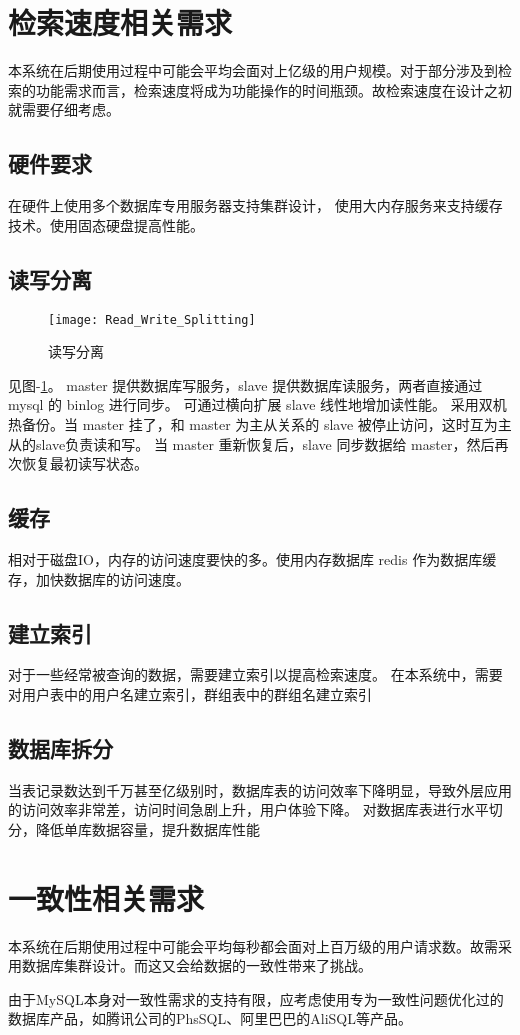{\color{red}
\section{检索速度相关需求}
本系统在后期使用过程中可能会平均会面对上亿级的用户规模。对于部分涉及到检索的功能需求而言，检索速度将成为功能操作的时间瓶颈。故检索速度在设计之初就需要仔细考虑。
\subsection{硬件要求}
在硬件上使用多个数据库专用服务器支持集群设计，
使用大内存服务来支持缓存技术。使用固态硬盘提高性能。


\subsection{读写分离}

\begin{figure}[h]
	\centering
	\texttt{[image: Read\_Write\_Splitting]}
	\caption{读写分离} \label{fig:Read_Write_Splitting}
\end{figure}

见图-\ref{fig:Read_Write_Splitting}。
master 提供数据库写服务，slave 提供数据库读服务，两者直接通过 mysql 的 binlog 进行同步。
可通过横向扩展 slave 线性地增加读性能。
采用双机热备份。当 master 挂了，和 master 为主从关系的 slave 被停止访问，这时互为主从的slave负责读和写。
当 master 重新恢复后，slave 同步数据给 master，然后再次恢复最初读写状态。


\subsection{缓存}
相对于磁盘IO，内存的访问速度要快的多。使用内存数据库 redis 作为数据库缓存，加快数据库的访问速度。


\subsection{建立索引}
对于一些经常被查询的数据，需要建立索引以提高检索速度。
在本系统中，需要对用户表中的用户名建立索引，群组表中的群组名建立索引


\subsection{数据库拆分}
当表记录数达到千万甚至亿级别时，数据库表的访问效率下降明显，导致外层应用的访问效率非常差，访问时间急剧上升，用户体验下降。
对数据库表进行水平切分，降低单库数据容量，提升数据库性能


\section{一致性相关需求}
本系统在后期使用过程中可能会平均每秒都会面对上百万级的用户请求数。故需采用数据库集群设计。而这又会给数据的一致性带来了挑战。

由于MySQL本身对一致性需求的支持有限，应考虑使用专为一致性问题优化过的数据库产品，如腾讯公司的PhsSQL、阿里巴巴的AliSQL等产品。

}